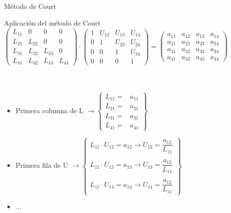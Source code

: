 \documentclass [8pt] {beamer}
\begin{document}
        \begin{frame}{Método de Court}
            \begin{block}{Aplicación del método de Court}
                {$\left( \begin{array}{cccc}
                L_{11} & 0 & 0 & 0\\
                L_{21} & L_{22} & 0 & 0\\
                L_{31} & L_{32} & L_{33} & 0\\
                L_{41} & L_{42} & L_{43} & L_{44}
                \end{array} \right) \cdot \left( \begin{array}{cccc}
                1 & U_{12} & U_{13} & U_{14}\\
                0 & 1 & U_{23} & U_{24}\\
                0 & 0 & 1 & U_{34}\\
                0 & 0 & 0 & 1
                \end{array} \right) = \left( \begin{array}{cccc}
                a_{11} & a_{12} & a_{13} & a_{14}\\
                a_{21} & a_{22} & a_{23} & a_{24}\\
                a_{31} & a_{32} & a_{33} & a_{34}\\
                a_{41} & a_{42} & a_{43} & a_{44}
                \end{array} \right)$} \\ \ \\ \ \\
                \begin{itemize}
                    \item {Primera columna de L $ \rightarrow \left\{ \begin{array}{ll}
                    L_{11} = & a_{11}\\
                    L_{21} = & a_{21}\\
                    L_{31} = & a_{31}\\
                    L_{41} = & a_{41}
                    \end{array} \right\} $}
                    \item{Primera fila de U $\rightarrow \left\{ \begin{array}{l}
                    L_{11} \cdot U_{12} = a_{12} \rightarrow U_{12} = \dfrac{a_{12}}{L_{11}}\\ \ \\
                    L_{11} \cdot U_{13} = a_{13} \rightarrow U_{13} = \dfrac{a_{12}}{L_{11}}\\ \ \\
                    L_{11} \cdot U_{14} = a_{14} \rightarrow U_{14} = \dfrac{a_{12}}{L_{11}}
                    \end{array} \right\} $}
                    \item{$ \ldots $}
                \end{itemize}
            \end{block}
        \end{frame}
\end{document}
